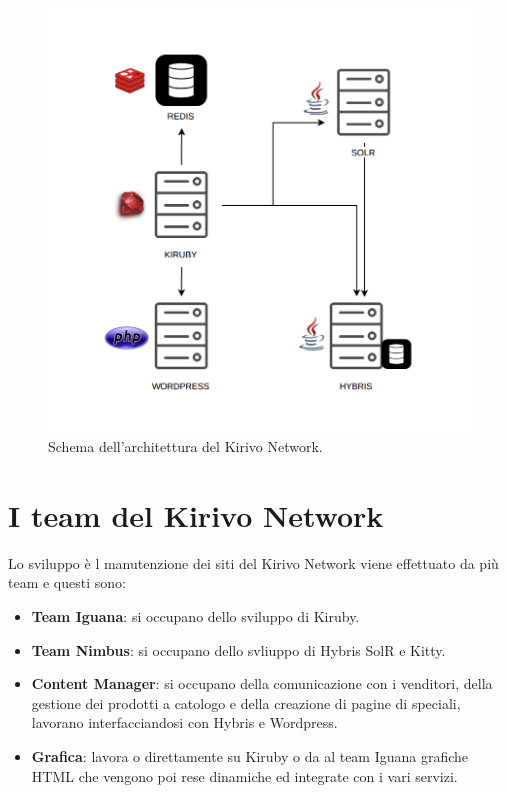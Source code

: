 \begin{figure}
  \includegraphics[width=\textwidth]{figure/arch.png}
  \caption{Schema dell'architettura del Kirivo Network.}
  \label{fig:kn}
\end{figure}


\newpage

\section{I team del Kirivo Network}
Lo sviluppo è l manutenzione dei siti del Kirivo Network viene effettuato da più team e questi sono:
\begin{itemize}
\item {\bf Team Iguana}: si occupano dello sviluppo di Kiruby.
\item {\bf Team Nimbus}: si occupano dello svliuppo di Hybris SolR e Kitty.
\item {\bf Content Manager}: si occupano della comunicazione con i venditori, della gestione dei prodotti a catologo
 e della creazione di pagine di speciali, lavorano interfacciandosi con Hybris e Wordpress.
\item {\bf Grafica}: lavora o direttamente su Kiruby o da al team Iguana grafiche HTML che vengono poi rese dinamiche 
ed integrate con i vari servizi.
\end{itemize}

